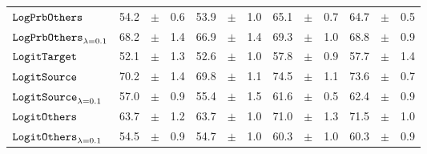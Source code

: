 \documentclass[../main.tex]{subfiles}
\begin{document}
\begin{tabular}{lrrrrrrrrrrrr}
$\mathtt{LogPrbOthers}_{}$              & 54.2                            & $\pm$                                        & 0.6                        & 53.9                                                                                 & $\pm$ & 1.0                                & 65.1  & $\pm$ & 0.7             & 64.7  & $\pm$ & 0.5                           \\
\rowcolor{lightgray}
$\mathtt{LogPrbOthers}_{\lambda=0.1}$   & 68.2                            & $\pm$                                        & 1.4                        & 66.9                                                                                   & $\pm$ & 1.4                                & 69.3  & $\pm$ & 1.0             & 68.8  & $\pm$ & 0.9                           \\
$\mathtt{LogitTarget}$                 & 52.1                            & $\pm$                                        & 1.3                        & 52.6                                                                                     & $\pm$ & 1.0                                & 57.8  & $\pm$ & 0.9             & 57.7  & $\pm$ & 1.4                           \\
\rowcolor{lightgray}
$\mathtt{LogitSource}_{}$               & 70.2                            & $\pm$                                        & 1.4                        & 69.8                                                                                   & $\pm$ & 1.1                                & 74.5  & $\pm$ & 1.1             & 73.6  & $\pm$ & 0.7                           \\
$\mathtt{LogitSource}_{\lambda=0.1}$    & 57.0                            & $\pm$                                        & 0.9                        & 55.4                                                                                   & $\pm$ & 1.5                                & 61.6  & $\pm$ & 0.5             & 62.4  & $\pm$ & 0.9                           \\
$\mathtt{LogitOthers}_{}$               & 63.7                            & $\pm$                                        & 1.2                        & 63.7                                                                                 & $\pm$ & 1.0                                & 71.0  & $\pm$ & 1.3             & 71.5  & $\pm$ & 1.0                           \\
$\mathtt{LogitOthers}_{\lambda=0.1}$    & 54.5                            & $\pm$                                        & 0.9                        & 54.7                                                                                   & $\pm$ & 1.0                                & 60.3  & $\pm$ & 1.0             & 60.3  & $\pm$ & 0.9                           \\
\bottomrule
\end{tabular}
\end{document}
